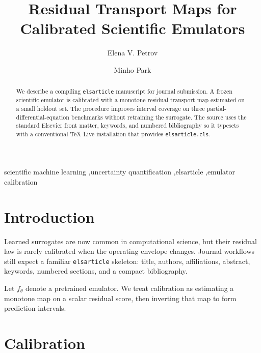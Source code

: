 \documentclass[preprint,12pt]{elsarticle}
\begin{document}
\begin{frontmatter}

\title{Residual Transport Maps for Calibrated Scientific Emulators}
\author[inst1]{Elena V. Petrov}
\author[inst1,inst2]{Minho Park}
\address[inst1]{Department of Applied Mathematics, Example University, Boston, 02115, United States}
\address[inst2]{Center for Scientific Computing, Example University, Boston, 02115, United States}

\begin{abstract}
We describe a compiling \texttt{elsarticle} manuscript for journal submission. A frozen scientific emulator is calibrated with a monotone residual transport map estimated on a small holdout set. The procedure improves interval coverage on three partial-differential-equation benchmarks without retraining the surrogate. The source uses the standard Elsevier front matter, keywords, and numbered bibliography so it typesets with a conventional TeX Live installation that provides \texttt{elsarticle.cls}.
\end{abstract}

\begin{keyword}
scientific machine learning \sep uncertainty quantification \sep elsarticle \sep emulator calibration
\end{keyword}

\end{frontmatter}

\section{Introduction}

Learned surrogates are now common in computational science, but their residual law is rarely calibrated when the operating envelope changes. Journal workflows still expect a familiar \texttt{elsarticle} skeleton: title, authors, affiliations, abstract, keywords, numbered sections, and a compact bibliography.

Let $f_\theta$ denote a pretrained emulator. We treat calibration as estimating a monotone map on a scalar residual score, then inverting that map to form prediction intervals.

\section{Calibration}
\end{document}
